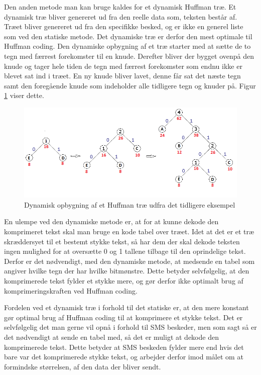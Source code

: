 Den anden metode man kan bruge kaldes for et dynamisk Huffman træ. Et dynamisk træ bliver genereret ud fra den reelle data som, teksten består af. Træet bliver genereret ud fra den specifikke besked, og er ikke en generel liste som ved den statiske metode. Det dynamiske træ er derfor den mest optimale til Huffman coding. Den dynamiske opbygning af et træ starter med at sætte de to tegn med færrest forekomster til en knude. Derefter bliver der bygget ovenpå den knude og tager hele tiden de tegn med færrest forekomster som endnu ikke er blevet sat ind i træet. En ny knude bliver lavet, denne får sat det næste tegn samt den foregående knude som indeholder alle tidligere tegn og knuder på. Figur \ref{fig:dynamic_tree} viser dette.

\begin{figure}[H]
\centering
\includegraphics[width=\linewidth]{Billeder/dynamisk.png}
\caption{Dynamisk opbygning af et Huffman træ udfra det tidligere eksempel \cite{Hufftree_1}}
\label{fig:dynamic_tree}
\end{figure}

En ulempe ved den dynamiske metode er, at for at kunne dekode den komprimeret tekst skal man bruge en kode tabel over træet. Idet at det er et træ skræddersyet til et bestemt stykke tekst, så har dem der skal dekode teksten ingen mulighed for at oversætte 0 og 1 tallene tilbage til den oprindelige tekst. Derfor er det nødvendigt, med den dynamiske metode, at medsende en tabel som angiver hvilke tegn der har hvilke bitmønstre. Dette betyder selvfølgelig, at den komprimerede tekst fylder et stykke mere, og gør derfor ikke optimalt brug af komprimeringskraften ved Huffman coding. \cite{Hufftree_4}

Fordelen ved et dynamisk træ i forhold til det statiske er, at den mere konstant gør optimal brug af Huffman coding til at komprimere et stykke tekst. Det er selvfølgelig det man gerne vil opnå i forhold til SMS beskeder, men som sagt så er det nødvendigt at sende en tabel med, så det er muligt at dekode den komprimerede tekst. Dette betyder at SMS beskeden fylder mere end hvis det bare var det komprimerede stykke tekst, og arbejder derfor imod målet om at formindske størrelsen, af den data der bliver sendt.